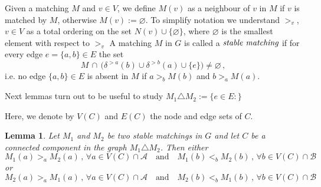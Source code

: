 \documentclass[preprint]{elsarticle}
\newtheorem{lemma}[fact]{Lemma}
\begin{document}
Given a matching $M$ and $v\in V$, we define $M(v)$ as a neighbour of $v$ in $M$ if $v$ is matched by $M$, otherwise $M(v):=\varnothing$. To simplify notation we understand $>_v$, $v\in V$ as a total ordering on the set $N(v)\cup\{\varnothing\}$, where $\varnothing$ is the smallest element with respect to $>_v$
A matching $M$ in $G$ is called a $\emph{stable matching}$ if for every edge $e=\{a,b\}\in E$ the set
\begin{equation}\label{eq:stability_def}
		M \, \cap \, \big(\delta^{>a}(b) \cup \delta^{>b}(a) \cup  \{e\} \big)\neq\varnothing\,,
\end{equation}
i.e. no edge $\{a,b\}\in E$ is absent in $M$  if $a>_b M(b)$ and $b>_a M(a)$.



Next lemmas turn out to be useful to study $M_1\triangle M_2:=\{ e\in E: \}$

Here, we denote by $V(C)$ and $E(C)$ the node and edge sets of $C$.

\begin{lemma}\label{lemma:pref}
Let $M_1$ and $M_2$ be two stable matchings in $G$ and let $C$ be a connected component in the graph $M_1 \triangle M_2$. Then either
\begin{equation}\label{eq:pref_first}
	M_1(a)>_a M_2(a)\,,\,\forall a\in V(C) \cap\mathcal{A}\quad \text{and} \quad  M_1(b)<_b M_2(b)\,,\,  \forall b\in V(C) \cap\mathcal{B}
\end{equation}
or 
\begin{equation}\label{eq:pref_second}
	M_2(a)>_a M_1(a)\,,\,\forall a\in V(C) \cap\mathcal{A}\quad \text{and} \quad  M_2(b)<_b M_1(b)\,,\,  \forall b\in V(C) \cap\mathcal{B}
\end{equation}
\end{lemma}
\end{document}
